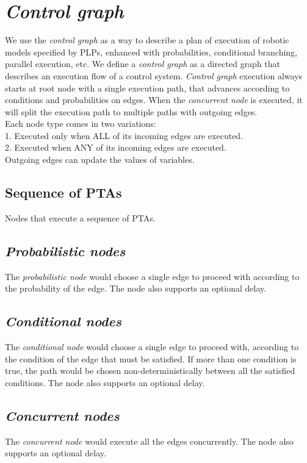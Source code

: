 \chapter{\textit{Control graph}}
We use the \textit{control graph} as a way to describe a plan of execution of robotic models specified by PLPs, enhanced with probabilities, conditional branching, parallel execution, etc. We define a \textit{control graph} as a directed graph that describes an execution flow of a control system. \textit{Control graph} execution always starts at root node with a single execution path, that advances according to conditions and probabilities on edges. When the \textit{concurrent node} is executed, it will split the execution path to multiple paths with outgoing edges. \\
Each node type comes in two variations: \\
            1. Executed only when ALL of its incoming edges are executed.\\
            2. Executed when ANY of its incoming edges are executed.\\
Outgoing edges can update the values of variables.\\
\clearpage
\section{Sequence of PTAs}
Nodes that execute a sequence of PTAs.   \clearpage
\section{\textit{Probabilistic nodes}}
The \textit{probabilistic node} would choose a single edge to proceed with according to the probability of the edge. The node also supports an optional delay.  \clearpage
\section{\textit{Conditional nodes}}
The \textit{conditional node} would choose a single edge to proceed with, according to the condition of the edge that must be satisfied. If more than one condition is true, the path would be chosen non-deterministically between all the satisfied conditions. The node also supports an optional delay.   \clearpage
\section{\textit{Concurrent nodes}}
The \textit{concurrent node} would execute all the edges concurrently. The node also supports an optional delay.  \clearpage
